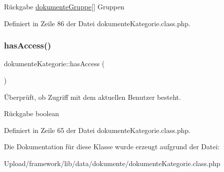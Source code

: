 \begin{DoxyReturn}{Rückgabe}
\mbox{\hyperlink{classdokumente_gruppe}{dokumente\+Gruppe}}\mbox{[}\mbox{]} Gruppen 
\end{DoxyReturn}


Definiert in Zeile 86 der Datei dokumente\+Kategorie.\+class.\+php.

\mbox{\label{classdokumente_kategorie_ae5f27a53ca5a1b4ee548225d4219163e}} 
\subsubsection{\texorpdfstring{has\+Access()}{hasAccess()}}
{\footnotesize\ttfamily dokumente\+Kategorie\+::has\+Access (\begin{DoxyParamCaption}{ }\end{DoxyParamCaption})}

Überprüft, ob Zugriff mit dem aktuellen Benutzer besteht. \begin{DoxyReturn}{Rückgabe}
boolean 
\end{DoxyReturn}


Definiert in Zeile 65 der Datei dokumente\+Kategorie.\+class.\+php.



Die Dokumentation für diese Klasse wurde erzeugt aufgrund der Datei\+:\begin{DoxyCompactItemize}
\item 
Upload/framework/lib/data/dokumente/dokumente\+Kategorie.\+class.\+php\end{DoxyCompactItemize}
